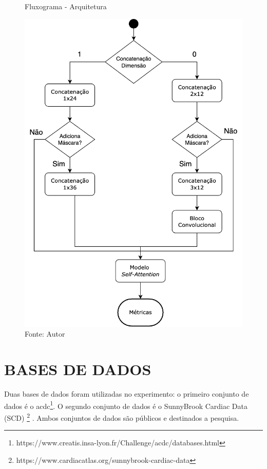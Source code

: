 \begin{figure}[H]
    \centering
    \caption{Fluxograma - Arquitetura}
    \includegraphics[scale=0.38]{figures/fig015-02.png}
    \caption*{Fonte: Autor}
    \label{fig:fig015-02}
\end{figure}

\section{BASES DE DADOS} 
\label{subsec:cap4_dataset}

Duas bases de dados foram utilizadas no experimento: o primeiro conjunto de dados é o \gls{acdc}\footnote{https://www.creatis.insa-lyon.fr/Challenge/acdc/databases.html}. O segundo conjunto de dados é o SunnyBrook Cardiac Data (SCD) \footnote{https://www.cardiacatlas.org/sunnybrook-cardiac-data} \cite{radauEvaluationFrameworkAlgorithms2009}. Ambos conjuntos de dados são públicos e destinados a pesquisa.

